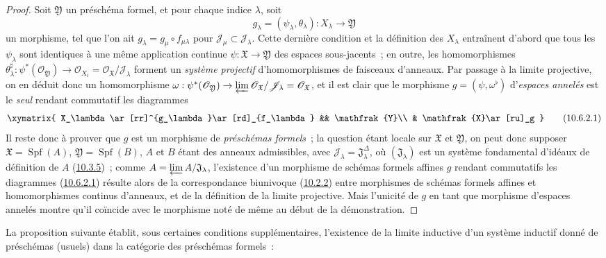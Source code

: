\begin{proof}
Soit $\mathfrak{Y}$ un préschéma formel, et pour chaque indice $\lambda$,
soit
\[
  g_\lambda=(\psi_\lambda,\theta_\lambda):X_\lambda\to\mathfrak{Y}
\]
un morphisme, tel que l'on ait
$g_\lambda=g_\mu\circ f_{\mu\lambda}$ pour
$\mathscr{J}_\mu\subset\mathscr{J}_\lambda$. Cette dernière condition
et la définition des $X_\lambda$ entraînent d'abord que tous les
$\psi_\lambda$ sont identiques à une même application continue
$\psi:\mathfrak{X}\to\mathfrak{Y}$ des espaces sous-jacents~; en outre,
les homomorphismes
$\theta_\lambda^\sharp:\psi^*(\mathscr{O}_{\mathfrak{Y}})\to
\mathscr{O}_{X_i}=
\mathscr{O}_{\mathfrak{X}}/\mathscr{J}_\lambda$ forment un
\emph{système projectif} d'homomorphismes de faisceaux d'anneaux. Par
passage à la limite projective, on en déduit donc un homomorphisme
$\omega:\psi^*(\mathscr{O}_{\mathfrak{Y}})\to
  \varprojlim\mathscr{O}_{\mathfrak{X}}/\mathscr{J}_\lambda
  =\mathscr{O}_{\mathfrak{X}}$,
et il est clair que le morphisme $g=(\psi,\omega^\flat)$ d'\emph{espaces
annelés} est le \emph{seul} rendant commutatif les diagrammes
\[
  \label{I.10.6.2.1-fr}
  \xymatrix{
    X_\lambda\ar[rr]^{g_\lambda}\ar[rd]_{f_\lambda} &&
    \mathfrak{Y}\\
    & \mathfrak{X}\ar[ru]_g
  }
  \tag{10.6.2.1}
\]
Il reste donc à prouver que $g$ est un morphisme de \emph{préschémas
formels}~; la question étant locale sur $\mathfrak{X}$ et
$\mathfrak{Y}$, on peut donc supposer
$\mathfrak{X}=\operatorname{Spf}(A)$,
$\mathfrak{Y}=\operatorname{Spf}(B)$, $A$ et $B$ étant des anneaux
admissibles, avec
$\mathscr{J}_\lambda=\mathfrak{J}_\lambda^{\Delta}$, où
$(\mathfrak{J}_\lambda)$ est un système fondamental d'idéaux de
définition de $A$ (\hyperref[I.10.3.5-fr]{10.3.5})~; comme
$A=\varprojlim A/\mathfrak{J}_\lambda$, l'existence d'un morphisme de
schémas formels affines $g$ rendant commutatifs les diagrammes
(\hyperref[I.10.6.2.1-fr]{10.6.2.1}) résulte alors de la correspondance
biunivoque (\hyperref[I.10.2.2-fr]{10.2.2}) entre morphismes de schémas
formels affines et homomorphismes continus d'anneaux, et de la définition
de la limite projective. Mais l'unicité de $g$ en tant que morphisme
d'espaces annelés montre qu'il coïncide avec le morphisme noté de même au
début de la démonstration.
\end{proof}

La proposition suivante établit, sous certaines conditions
supplémentaires, l'existence de la limite inductive d'un système inductif
donné de préschémas (usuels) dans la catégorie des préschémas formels~:

